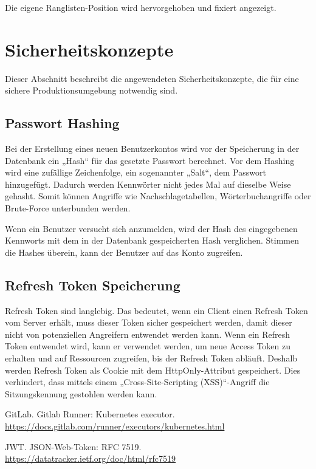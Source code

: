 \documentclass[letterpaper, 10 pt, conference]{ieeeconf}
\begin{document}
Die eigene Ranglisten-Position wird hervorgehoben und fixiert angezeigt.

\section{Sicherheitskonzepte}

Dieser Abschnitt beschreibt die angewendeten Sicherheitskonzepte, die für eine sichere Produktionsumgebung notwendig sind.

\subsection{Passwort Hashing}
Bei der Erstellung eines neuen Benutzerkontos wird vor der Speicherung in der Datenbank ein „Hash“ für das gesetzte Passwort berechnet. Vor dem Hashing wird eine zufällige Zeichenfolge, ein sogenannter „Salt“, dem Passwort hinzugefügt. Dadurch werden Kennwörter nicht jedes Mal auf dieselbe Weise gehasht. Somit können Angriffe wie Nachschlagetabellen, Wörterbuchangriffe oder Brute-Force unterbunden werden. 

Wenn ein Benutzer versucht sich anzumelden, wird der Hash des eingegebenen Kennworts mit dem in der Datenbank gespeicherten Hash verglichen.  Stimmen die Hashes überein, kann der Benutzer auf das Konto zugreifen.

\subsection{Refresh Token Speicherung} \label{refreshToken}
Refresh Token sind langlebig. Das bedeutet, wenn ein Client einen Refresh Token vom Server erhält, muss dieser Token sicher gespeichert werden, damit dieser nicht von potenziellen Angreifern entwendet werden kann. Wenn ein Refresh Token entwendet wird, kann er verwendet werden, um neue Access Token zu erhalten und auf Ressourcen zugreifen, bis der Refresh Token abläuft.  Deshalb werden Refresh Token als Cookie mit dem HttpOnly-Attribut gespeichert. Dies verhindert, dass mittels einem „Cross-Site-Scripting (XSS)“-Angriff die Sitzungskennung gestohlen werden kann. 


\begin{thebibliography}{99}

 GitLab.  Gitlab Runner: Kubernetes executor.   \url{https://docs.gitlab.com/runner/executors/kubernetes.html}

 JWT.  JSON-Web-Token: RFC 7519.   \url{https://datatracker.ietf.org/doc/html/rfc7519}

\end{thebibliography}


\addtolength{\textheight}{-12cm}
\end{document}
